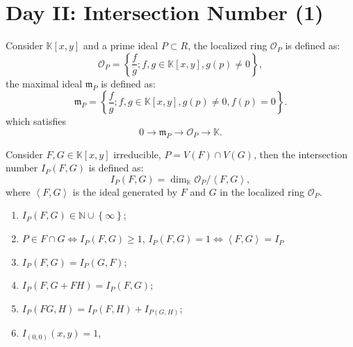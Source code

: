 \documentclass[10pt]{article}
\begin{document}
\section{Day II: Intersection Number (1)}

\begin{definition}
  Consider $ \mathbb{K}[x,y]$ and a prime ideal $ P \subset R$, the localized ring $ \mathcal{O}_P$ is defined as:
  \begin{equation*}
    \mathcal{O}_P = \left\{ \frac{f}{g} ; f, g \in \mathbb{K}[x,y] , g(p) \neq 0 \right\},
  \end{equation*}
  the maximal ideal $ \mathfrak{m}_P$ is defined as:
  \begin{equation*}
    \mathfrak{m}_P = \left\{ \frac{f}{g} ; f,g \in \mathbb{K}[x,y] , g(p) \neq 0 , f(p) = 0\right\}.
  \end{equation*}
  which satisfies
  \begin{equation*}
    0 \rightarrow \mathfrak{m}_P \rightarrow \mathcal{O}_P \rightarrow \mathbb{K}.
  \end{equation*}
\end{definition}

\begin{definition}
  Consider $ F, G \in \mathbb{K}[x,y]$ irreducible, $ P = V(F) \cap V(G)$, then the intersection number $ I_P(F,G)$ is defined as:
  \begin{equation*}
    I_{P}(F,G) = \dim_{\mathbb{K}} \mathcal{O}_P / \left< F,G \right>,
  \end{equation*}
  where $\left< F,G \right>$ is the ideal generated by $ F$ and $ G$ in the localized ring $ \mathcal{O}_P$.
\end{definition}

\begin{proposition}
  \begin{enumerate}[(1)]
    \item $ I_{P}(F,G) \in \mathbb{N} \cup \left\{ \infty  \right\}$;
    \item $ P \in F \cap G \Leftrightarrow I_{P}(F,G) \ge 1$, $ I_{P}(F,G) = 1 \Leftrightarrow \left< F,G \right> = I_{P}$
    \item $ I_{P}(F,G) = I_{P}(G,F)$;
    \item $ I_{P}(F, G+FH) = I_{P}(F,G)$;
    \item $ I_{P}(FG, H) = I_{P}(F,H) + I_{P(G,H)};$
    \item $ I_{(0,0)}(x,y) = 1$,
  \end{enumerate}
\end{proposition}
\end{document}
